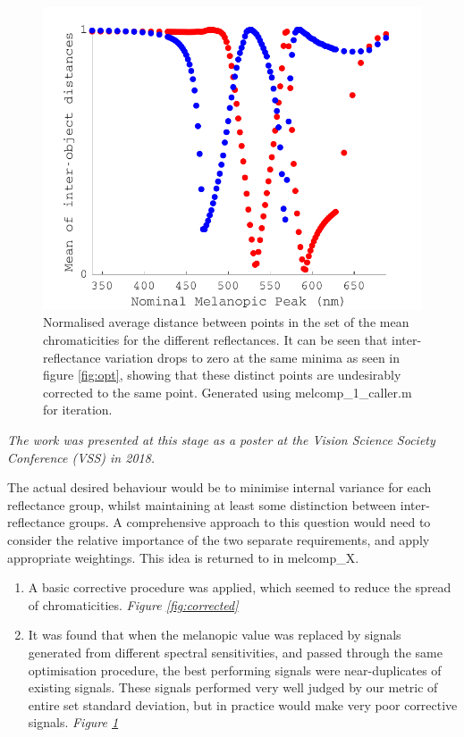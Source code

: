 \begin{figure}[htbp]
    \includegraphics[max width=\textwidth]{figs/comp/melcomp_1_caller/sdmeans.pdf}
    \caption{Normalised average distance between points in the set of the mean chromaticities for the different reflectances. It can be seen that inter-reflectance variation drops to zero at the same minima as seen in figure \ref{fig:opt}, showing that these distinct points are undesirably corrected to the same point. Generated using melcomp\_1\_caller.m for iteration.}
    \label{fig:sdmeans}
\end{figure} 

\textit{The work was presented at this stage as a poster at the \emph{Vision Science Society Conference (VSS)} in 2018.}

The actual desired behaviour would be to minimise internal variance for each reflectance group, whilst maintaining at least some distinction between inter-reflectance groups. A comprehensive approach to this question would need to consider the relative importance of the two separate requirements, and apply appropriate weightings. This idea is returned to in melcomp\_X. %

\begin{enumerate}
    \item A basic corrective procedure was applied, which seemed to reduce the spread of chromaticities. \emph{Figure \ref{fig:corrected}} 
    \item It was found that when the melanopic value was replaced by signals generated from different spectral sensitivities, and passed through the same optimisation procedure, the best performing signals were near-duplicates of existing signals. These signals performed very well judged by our metric of entire set standard deviation, but in practice would make very poor corrective signals. \emph{Figure \ref{fig:sdmeans}}
\end{enumerate}

